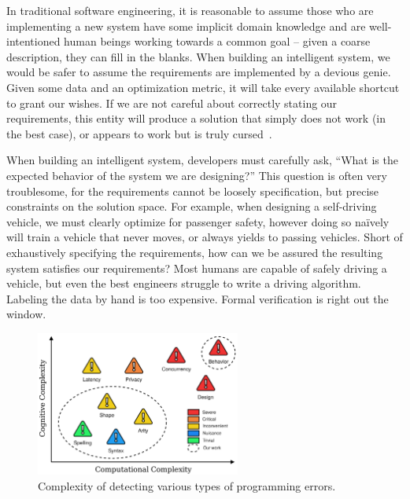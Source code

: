 In traditional software engineering, it is reasonable to assume those who are implementing a new system have some implicit domain knowledge and are well-intentioned human beings working towards a common goal -- given a coarse description, they can fill in the blanks. When building an intelligent system, we would be safer to assume the requirements are implemented by a devious genie. Given some data and an optimization metric, it will take every available shortcut to grant our wishes. If we are not careful about correctly stating our requirements, this entity will produce a solution that simply does not work (in the best case), or appears to work but is truly cursed~\citep{bellman1957dynamic}.

When building an intelligent system, developers must carefully ask, ``What is the expected behavior of the system we are designing?'' This question is often very troublesome, for the requirements cannot be loosely specification, but precise constraints on the solution space. For example, when designing a self-driving vehicle, we must clearly optimize for passenger safety, however doing so na\"ively will train a vehicle that never moves, or always yields to passing vehicles. Short of exhaustively specifying the requirements, how can we be assured the resulting system satisfies our requirements? Most humans are capable of safely driving a vehicle, but even the best engineers struggle to write a driving algorithm. Labeling the data by hand is too expensive. Formal verification is right out the window.

\begin{figure}
    \centering
    \includegraphics[width=0.60\textwidth]{../figures/verification_complexity.png}
    \caption{Complexity of detecting various types of programming errors.}
    \label{fig:verification_complexity}
\end{figure}

